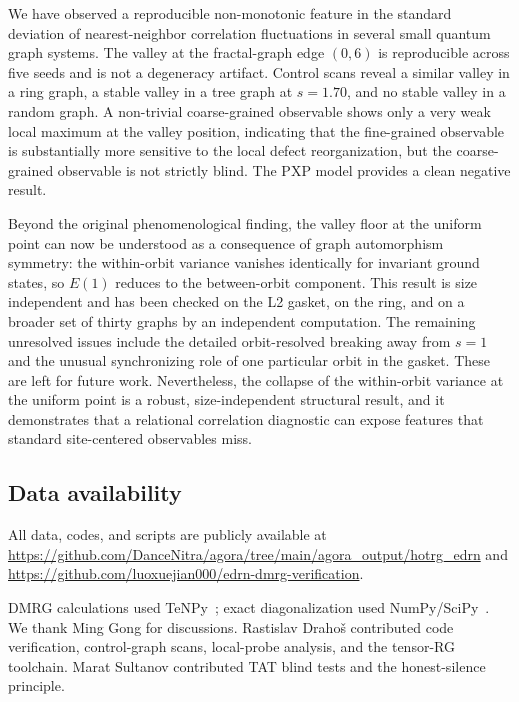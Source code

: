 \documentclass[aps,prb,reprint,superscriptaddress]{revtex4-2}
\begin{document}
We have observed a reproducible non-monotonic feature in the standard deviation of nearest-neighbor correlation fluctuations in several small quantum graph systems. The valley at the fractal-graph edge $(0,6)$ is reproducible across five seeds and is not a degeneracy artifact. Control scans reveal a similar valley in a ring graph, a stable valley in a tree graph at $s=1.70$, and no stable valley in a random graph. A non-trivial coarse-grained observable shows only a very weak local maximum at the valley position, indicating that the fine-grained observable is substantially more sensitive to the local defect reorganization, but the coarse-grained observable is not strictly blind. The PXP model provides a clean negative result.

Beyond the original phenomenological finding, the valley floor at the uniform point can now be understood as a consequence of graph automorphism symmetry: the within-orbit variance vanishes identically for invariant ground states, so $E(1)$ reduces to the between-orbit component. This result is size independent and has been checked on the L2 gasket, on the ring, and on a broader set of thirty graphs by an independent computation. The remaining unresolved issues include the detailed orbit-resolved breaking away from $s=1$ and the unusual synchronizing role of one particular orbit in the gasket. These are left for future work. Nevertheless, the collapse of the within-orbit variance at the uniform point is a robust, size-independent structural result, and it demonstrates that a relational correlation diagnostic can expose features that standard site-centered observables miss.

\subsection*{Data availability}
All data, codes, and scripts are publicly available at \url{https://github.com/DanceNitra/agora/tree/main/agora_output/hotrg_edrn} and \url{https://github.com/luoxuejian000/edrn-dmrg-verification}.

\begin{acknowledgments}
DMRG calculations used TeNPy~\cite{Hauschild2018,Schollwock2011}; exact diagonalization used NumPy/SciPy~\cite{Harris2020}. We thank Ming Gong for discussions. Rastislav Draho\v{s} contributed code verification, control-graph scans, local-probe analysis, and the tensor-RG toolchain. Marat Sultanov contributed TAT blind tests and the honest-silence principle.
\end{acknowledgments}
\end{document}
